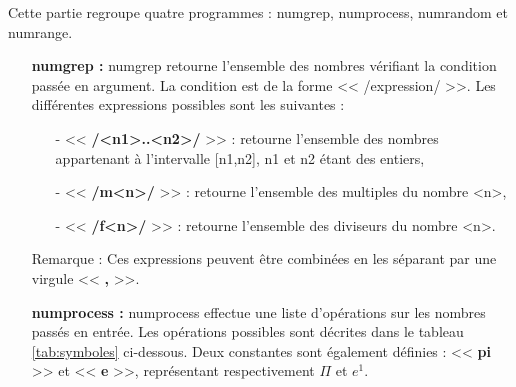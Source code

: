 Cette partie regroupe quatre programmes : numgrep, numprocess, numrandom et numrange.
\newline
\begin{itemize}
 \item[\textbullet] \textbf{numgrep :} numgrep retourne l'ensemble des nombres v\'erifiant la condition pass\'ee en argument. La condition est de la
forme << /expression/ >>. Les diff\'erentes expressions possibles sont les suivantes :
  \begin{itemize}
  \item[-] << \textbf{/<n1>..<n2>/} >> : retourne l'ensemble des nombres appartenant \`a l'intervalle [n1,n2], n1 et n2 \'etant des entiers,
  \item[-] << \textbf{/m<n>/} >> : retourne l'ensemble des multiples du nombre <n>,
  \item[-] << \textbf{/f<n>/} >> : retourne l'ensemble des diviseurs du nombre <n>.
  \end{itemize}
Remarque : Ces expressions peuvent \^etre combin\'ees en les s\'eparant par une virgule << \textbf{,} >>.
\newline{}
 \item[\textbullet] \textbf{numprocess :} numprocess effectue une liste d'op\'erations sur les nombres pass\'es en entr\'ee.
Les op\'erations possibles sont d\'ecrites dans le tableau \ref{tab:symboles} ci-dessous. Deux constantes sont \'egalement d\'efinies : << \textbf{pi} >> 
et << \textbf{e} >>, repr\'esentant respectivement $\Pi$ et $e^1$.
\begin{table}[h]
\begin{center}


\end{center}
\end{table}
\end{itemize}
